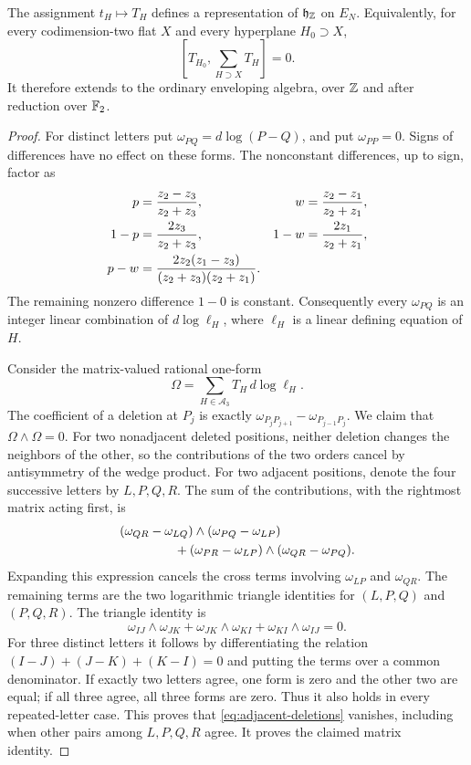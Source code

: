 \begin{proposition}\label{prop:deletion-representation}
The assignment $t_H\mapsto T_H$ defines a representation of
$\mathfrak h_{\mathbb Z}$ on $E_N$.  Equivalently, for every codimension-two
flat $X$ and every hyperplane $H_0\supset X$,
\begin{equation}\label{eq:deletion-flat}
 \left[T_{H_0},\sum_{H\supset X}T_H\right]=0.
\end{equation}
It therefore extends to the ordinary enveloping algebra, over $\mathbb Z$ and
after reduction over ${\mathbb F_2}$.
\end{proposition}

\begin{proof}
For distinct letters put $\omega_{PQ}=d\log(P-Q)$, and put
$\omega_{PP}=0$.  Signs of differences have no effect on these forms.
The nonconstant differences, up to sign, factor as
\begin{align}
 p&=\frac{z_2-z_3}{z_2+z_3},&
 w&=\frac{z_2-z_1}{z_2+z_1},\notag\\
 1-p&=\frac{2z_3}{z_2+z_3},&
 1-w&=\frac{2z_1}{z_2+z_1},\label{eq:deletion-factorization}\\
 p-w&=\frac{2z_2(z_1-z_3)}{(z_2+z_3)(z_2+z_1)}.&&\notag
\end{align}
The remaining nonzero difference $1-0$ is constant.  Consequently every
$\omega_{PQ}$ is an integer linear combination of $d\log\ell_H$, where
$\ell_H$ is a linear defining equation of $H$.

Consider the matrix-valued rational one-form
\[
 \Omega=\sum_{H\in\mathcal A_3}T_H\,d\log\ell_H.
\]
The coefficient of a deletion at $P_j$ is exactly
$\omega_{P_jP_{j+1}}-\omega_{P_{j-1}P_j}$.  We claim that
$\Omega\wedge\Omega=0$.  For two nonadjacent deleted positions, neither
deletion changes the neighbors of the other, so the contributions of
the two orders cancel by antisymmetry of the wedge product.  For two
adjacent positions, denote the four successive letters by $L,P,Q,R$.
The sum of the contributions, with the rightmost matrix acting first,
is
\begin{align}
 &(\omega_{QR}-\omega_{LQ})\wedge
       (\omega_{PQ}-\omega_{LP})\notag\\
 &\hspace{15mm}+
 (\omega_{PR}-\omega_{LP})\wedge
       (\omega_{QR}-\omega_{PQ}).\label{eq:adjacent-deletions}
\end{align}
Expanding this expression cancels the cross terms involving
$\omega_{LP}$ and $\omega_{QR}$.  The remaining terms are the two
logarithmic triangle identities for $(L,P,Q)$ and $(P,Q,R)$.  The
triangle identity is
\[
 \omega_{IJ}\wedge\omega_{JK}
 +\omega_{JK}\wedge\omega_{KI}
 +\omega_{KI}\wedge\omega_{IJ}=0.
\]
For three distinct letters it follows by differentiating the relation
$(I-J)+(J-K)+(K-I)=0$ and putting the terms over a common denominator.
If exactly two letters agree, one form is zero and the other two are
equal; if all three agree, all three forms are zero.  Thus it also holds
in every repeated-letter case.  This proves that
\eqref{eq:adjacent-deletions} vanishes, including when other pairs among
$L,P,Q,R$ agree.  It proves the claimed matrix identity.


\end{proof}
